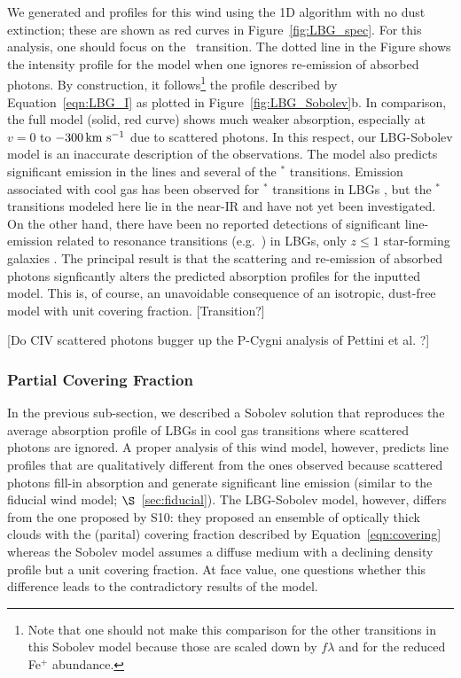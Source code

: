 \documentclass[12pt,preprint]{aastex}
\begin{document}
We generated  and  profiles for this wind
using the 1D algorithm with no dust extinction; these are shown as
red curves in Figure~\ref{fig:LBG_spec}.   For this analysis, one
should focus on the \mgiia\ transition.  The dotted line in the Figure
shows the intensity profile for the model when one ignores re-emission
of absorbed photons.  By construction, it follows\footnote{Note that
  one should not make this comparison for the other transitions in
  this Sobolev model because those are scaled down by $f\lambda$ and
  for  the reduced Fe$^+$ abundance.} the profile
described by Equation~\ref{eqn:LBG_I} as plotted in
Figure~\ref{fig:LBG_Sobolev}b.   In comparison, the full model (solid,
red curve)
shows much weaker absorption, especially at $v = 0$ to $-300 \, {\rm km~s^{-1}}$
due to scattered photons.
In this respect, our LBG-Sobolev model is an
inaccurate description of the observations. The model
also predicts significant emission in the  lines and several of
the $^*$ transitions.   Emission associated with cool gas
has been observed for $^*$
transitions in LBGs \citep{prs+02,shapley03}, but
the $^*$ transitions
modeled here lie in the near-IR and have not yet been investigated.
On the other hand, there have been no 
reported detections of significant line-emission related to resonance
transitions (e.g.\ ) in LBGs, only $z \le 1$ star-forming galaxies
\citep{wcp+09,rubin09}.  
The principal result is that the scattering and re-emission of
absorbed photons signficantly alters the predicted absorption profiles
for the inputted model.  This is, of course, an unavoidable
consequence of an isotropic, dust-free model with unit covering
fraction.
[Transition?]

[Do CIV scattered photons bugger up the P-Cygni analysis of Pettini
et al. ?]
 
\subsubsection{Partial Covering Fraction}
\label{sec:Covering}

In the previous sub-section, we described a Sobolev solution that
reproduces the average absorption profile of LBGs in cool gas
transitions where scattered photons are ignored.  A proper analysis of
this wind model, however, predicts line profiles that are qualitatively
different from the ones observed because scattered photons fill-in
absorption and generate significant line emission (similar to the
fiducial wind model; $\S$~\ref{sec:fiducial}).
The LBG-Sobolev model, however, differs from
the one proposed by S10:  they proposed an ensemble of optically
thick clouds with the (parital) covering fraction described by
Equation~\ref{eqn:covering} whereas the Sobolev model assumes
a diffuse medium with a declining density profile but a unit covering
fraction.  At face value, one questions whether this difference leads to
the contradictory results of the model. 
\end{document}
